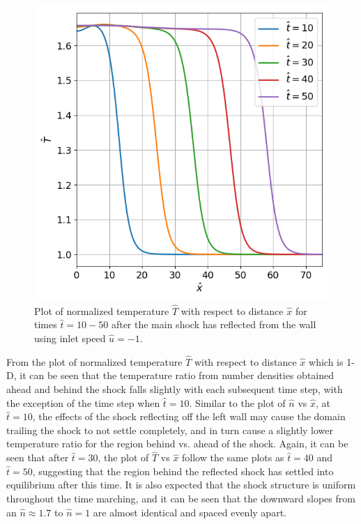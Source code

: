 \documentclass[a4paper]{article}
\begin{document}
\clearpage
\begin{figure}[hbt!]
    \centering
    \includegraphics[width=14cm]{plots/problem_a_T.png}
    \caption{\centering Plot of normalized temperature $\hat{T}$ with respect to distance $\hat{x}$ for times $\hat{t} = 10 - 50$ after the main shock has reflected from the wall using inlet speed $\hat{u} = -1$.}
    \label{problem_a_T}
\end{figure}
From the plot of normalized temperature $\hat{T}$ with respect to distance $\hat{x}$ which is 1-D, it can be seen that the temperature ratio from number densities obtained ahead and behind the shock falls slightly with each subsequent time step, with the exception of the time step when $\hat{t} = 10$. Similar to the plot of $\hat{n}$ vs $\hat{x}$, at $\hat{t} = 10$, the effects of the shock reflecting off the left wall may cause the domain trailing the shock to not settle completely, and in turn cause a slightly lower temperature ratio for the region behind vs. ahead of the shock. Again, it can be seen that after $\hat{t} = 30$, the plot of $\hat{T}$ vs $\hat{x}$ follow the same plots as $\hat{t} = 40$ and $\hat{t} = 50$, suggesting that the region behind the reflected shock has settled into equilibrium after this time. It is also expected that the shock structure is uniform throughout the time marching, and it can be seen that the downward slopes from an $\hat{n} \approx 1.7$ to $\hat{n} = 1$ are almost identical and spaced evenly apart. 
\end{document}
